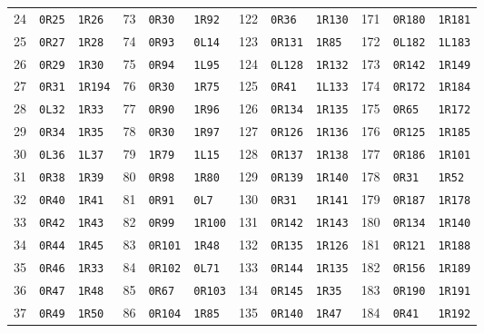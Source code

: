 \begin{center}
\begin{tabular}{rll@{\hspace{12pt}}rll@{\hspace{12pt}}rll@{\hspace{12pt}}rll}
24 & \texttt{0R25} & \texttt{1R26} & 73 & \texttt{0R30} & \texttt{1R92} & 122 & \texttt{0R36} & \texttt{1R130} & 171 & \texttt{0R180} & \texttt{1R181}\\
25 & \texttt{0R27} & \texttt{1R28} & 74 & \texttt{0R93} & \texttt{0L14} & 123 & \texttt{0R131} & \texttt{1R85} & 172 & \texttt{0L182} & \texttt{1L183}\\
26 & \texttt{0R29} & \texttt{1R30} & 75 & \texttt{0R94} & \texttt{1L95} & 124 & \texttt{0L128} & \texttt{1R132} & 173 & \texttt{0R142} & \texttt{1R149}\\
27 & \texttt{0R31} & \texttt{1R194} & 76 & \texttt{0R30} & \texttt{1R75} & 125 & \texttt{0R41} & \texttt{1L133} & 174 & \texttt{0R172} & \texttt{1R184}\\
28 & \texttt{0L32} & \texttt{1R33} & 77 & \texttt{0R90} & \texttt{1R96} & 126 & \texttt{0R134} & \texttt{1R135} & 175 & \texttt{0R65} & \texttt{1R172}\\
29 & \texttt{0R34} & \texttt{1R35} & 78 & \texttt{0R30} & \texttt{1R97} & 127 & \texttt{0R126} & \texttt{1R136} & 176 & \texttt{0R125} & \texttt{1R185}\\
30 & \texttt{0L36} & \texttt{1L37} & 79 & \texttt{1R79} & \texttt{1L15} & 128 & \texttt{0R137} & \texttt{1R138} & 177 & \texttt{0R186} & \texttt{1R101}\\
31 & \texttt{0R38} & \texttt{1R39} & 80 & \texttt{0R98} & \texttt{1R80} & 129 & \texttt{0R139} & \texttt{1R140} & 178 & \texttt{0R31} & \texttt{1R52}\\
32 & \texttt{0R40} & \texttt{1R41} & 81 & \texttt{0R91} & \texttt{0L7} & 130 & \texttt{0R31} & \texttt{1R141} & 179 & \texttt{0R187} & \texttt{1R178}\\
33 & \texttt{0R42} & \texttt{1R43} & 82 & \texttt{0R99} & \texttt{1R100} & 131 & \texttt{0R142} & \texttt{1R143} & 180 & \texttt{0R134} & \texttt{1R140}\\
34 & \texttt{0R44} & \texttt{1R45} & 83 & \texttt{0R101} & \texttt{1R48} & 132 & \texttt{0R135} & \texttt{1R126} & 181 & \texttt{0R121} & \texttt{1R188}\\
35 & \texttt{0R46} & \texttt{1R33} & 84 & \texttt{0R102} & \texttt{0L71} & 133 & \texttt{0R144} & \texttt{1R135} & 182 & \texttt{0R156} & \texttt{1R189}\\
36 & \texttt{0R47} & \texttt{1R48} & 85 & \texttt{0R67} & \texttt{0R103} & 134 & \texttt{0R145} & \texttt{1R35} & 183 & \texttt{0R190} & \texttt{1R191}\\
37 & \texttt{0R49} & \texttt{1R50} & 86 & \texttt{0R104} & \texttt{1R85} & 135 & \texttt{0R140} & \texttt{1R47} & 184 & \texttt{0R41} & \texttt{1R192}\\

\end{tabular}
\end{center}
